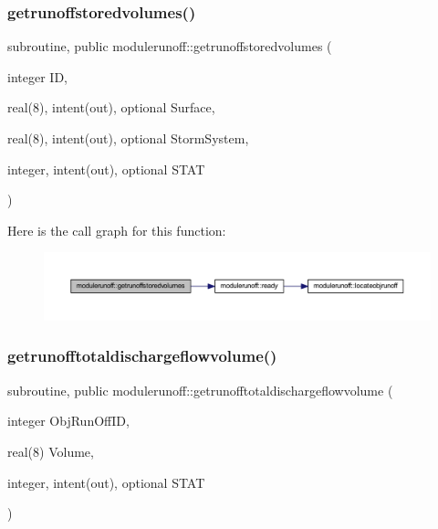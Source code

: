 \subsubsection{\texorpdfstring{getrunoffstoredvolumes()}{getrunoffstoredvolumes()}}
{\footnotesize\ttfamily subroutine, public modulerunoff\+::getrunoffstoredvolumes (\begin{DoxyParamCaption}\item[{integer}]{ID,  }\item[{real(8), intent(out), optional}]{Surface,  }\item[{real(8), intent(out), optional}]{Storm\+System,  }\item[{integer, intent(out), optional}]{S\+T\+AT }\end{DoxyParamCaption})}

Here is the call graph for this function\+:\nopagebreak
\begin{figure}[H]
\begin{center}
\leavevmode
\includegraphics[width=350pt]{namespacemodulerunoff_a9d8c0b3cb553adb36c76cde2d6bcaef7_cgraph}
\end{center}
\end{figure}
\mbox{\label{namespacemodulerunoff_aa4377dd8080b614590e0609f019f9764}} 
\subsubsection{\texorpdfstring{getrunofftotaldischargeflowvolume()}{getrunofftotaldischargeflowvolume()}}
{\footnotesize\ttfamily subroutine, public modulerunoff\+::getrunofftotaldischargeflowvolume (\begin{DoxyParamCaption}\item[{integer}]{Obj\+Run\+Off\+ID,  }\item[{real(8)}]{Volume,  }\item[{integer, intent(out), optional}]{S\+T\+AT }\end{DoxyParamCaption})}


